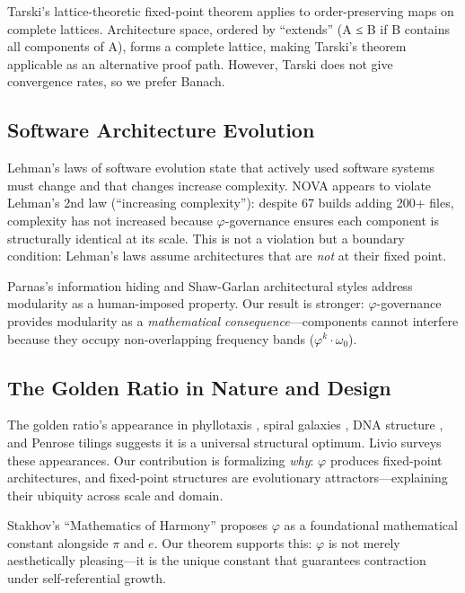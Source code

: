 \documentclass[12pt]{article}
\newcommand{\PHI}{\varphi}
\begin{document}
Tarski's lattice-theoretic fixed-point theorem \cite{tarski1955lattice} applies to order-preserving maps on complete lattices. Architecture space, ordered by ``extends'' (A ≤ B if B contains all components of A), forms a complete lattice, making Tarski's theorem applicable as an alternative proof path. However, Tarski does not give convergence rates, so we prefer Banach.

\subsection{Software Architecture Evolution}

Lehman's laws of software evolution \cite{lehman1980programs, lehman1996laws} state that actively used software systems must change and that changes increase complexity. NOVA appears to violate Lehman's 2nd law (``increasing complexity''): despite 67 builds adding 200+ files, complexity has not increased because $\PHI$-governance ensures each component is structurally identical at its scale. This is not a violation but a boundary condition: Lehman's laws assume architectures that are \emph{not} at their fixed point.

Parnas's information hiding \cite{parnas1972criteria} and Shaw-Garlan architectural styles \cite{shaw1996software} address modularity as a human-imposed property. Our result is stronger: $\PHI$-governance provides modularity as a \emph{mathematical consequence}—components cannot interfere because they occupy non-overlapping frequency bands ($\PHI^k \cdot \omega_0$).

\subsection{The Golden Ratio in Nature and Design}

The golden ratio's appearance in phyllotaxis \cite{jean1994phyllotaxis, douady1996phyllotaxis}, spiral galaxies \cite{davis2000spirals}, DNA structure \cite{yamagishi2001fibonacci}, and Penrose tilings \cite{penrose1974role} suggests it is a universal structural optimum. Livio \cite{livio2002golden} surveys these appearances. Our contribution is formalizing \emph{why}: $\PHI$ produces fixed-point architectures, and fixed-point structures are evolutionary attractors—explaining their ubiquity across scale and domain.

Stakhov's ``Mathematics of Harmony'' \cite{stakhov2009mathematics} proposes $\PHI$ as a foundational mathematical constant alongside $\pi$ and $e$. Our theorem supports this: $\PHI$ is not merely aesthetically pleasing—it is the unique constant that guarantees contraction under self-referential growth.
\end{document}
